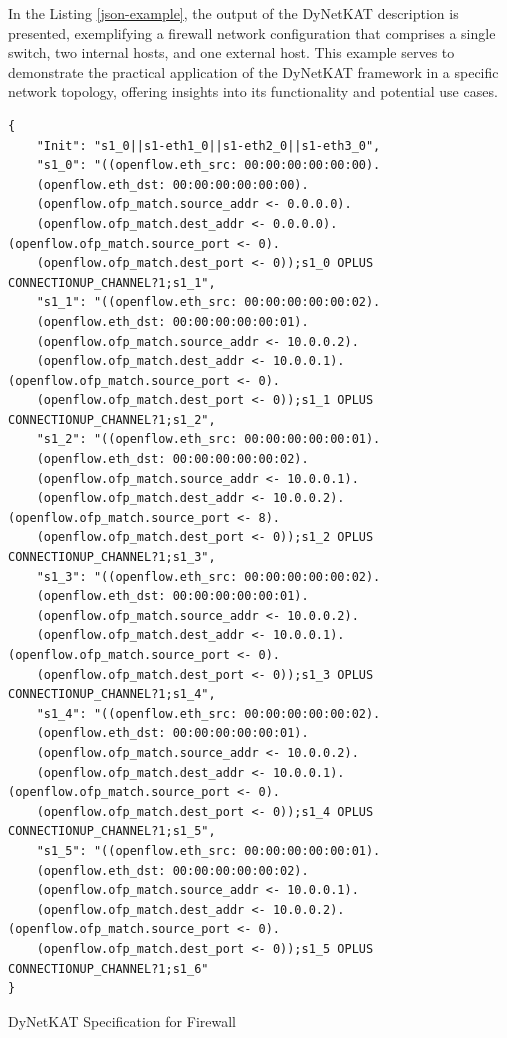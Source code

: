 \documentclass[english,10pt]{article}
\begin{document}
In the Listing \ref{json-example}, the output of the DyNetKAT description is presented, exemplifying a firewall network configuration that comprises a single switch, two internal hosts, and one external host. This example serves to demonstrate the practical application of the DyNetKAT framework in a specific network topology, offering insights into its functionality and potential use cases.



\begin{listing}
\begin{verbatim}
{
    "Init": "s1_0||s1-eth1_0||s1-eth2_0||s1-eth3_0",
    "s1_0": "((openflow.eth_src: 00:00:00:00:00:00).
    (openflow.eth_dst: 00:00:00:00:00:00).
    (openflow.ofp_match.source_addr <- 0.0.0.0).
    (openflow.ofp_match.dest_addr <- 0.0.0.0).(openflow.ofp_match.source_port <- 0).
    (openflow.ofp_match.dest_port <- 0));s1_0 OPLUS CONNECTIONUP_CHANNEL?1;s1_1",
    "s1_1": "((openflow.eth_src: 00:00:00:00:00:02).
    (openflow.eth_dst: 00:00:00:00:00:01).
    (openflow.ofp_match.source_addr <- 10.0.0.2).
    (openflow.ofp_match.dest_addr <- 10.0.0.1).(openflow.ofp_match.source_port <- 0).
    (openflow.ofp_match.dest_port <- 0));s1_1 OPLUS CONNECTIONUP_CHANNEL?1;s1_2",
    "s1_2": "((openflow.eth_src: 00:00:00:00:00:01).
    (openflow.eth_dst: 00:00:00:00:00:02).
    (openflow.ofp_match.source_addr <- 10.0.0.1).
    (openflow.ofp_match.dest_addr <- 10.0.0.2).(openflow.ofp_match.source_port <- 8).
    (openflow.ofp_match.dest_port <- 0));s1_2 OPLUS CONNECTIONUP_CHANNEL?1;s1_3",
    "s1_3": "((openflow.eth_src: 00:00:00:00:00:02).
    (openflow.eth_dst: 00:00:00:00:00:01).
    (openflow.ofp_match.source_addr <- 10.0.0.2).
    (openflow.ofp_match.dest_addr <- 10.0.0.1).(openflow.ofp_match.source_port <- 0).
    (openflow.ofp_match.dest_port <- 0));s1_3 OPLUS CONNECTIONUP_CHANNEL?1;s1_4",
    "s1_4": "((openflow.eth_src: 00:00:00:00:00:02).
    (openflow.eth_dst: 00:00:00:00:00:01).
    (openflow.ofp_match.source_addr <- 10.0.0.2).
    (openflow.ofp_match.dest_addr <- 10.0.0.1).(openflow.ofp_match.source_port <- 0).
    (openflow.ofp_match.dest_port <- 0));s1_4 OPLUS CONNECTIONUP_CHANNEL?1;s1_5",
    "s1_5": "((openflow.eth_src: 00:00:00:00:00:01).
    (openflow.eth_dst: 00:00:00:00:00:02).
    (openflow.ofp_match.source_addr <- 10.0.0.1).
    (openflow.ofp_match.dest_addr <- 10.0.0.2).(openflow.ofp_match.source_port <- 0).
    (openflow.ofp_match.dest_port <- 0));s1_5 OPLUS CONNECTIONUP_CHANNEL?1;s1_6"
}
\end{verbatim}
\caption{DyNetKAT Specification for Firewall} 
\label{json-example}
\end{listing}
\end{document}
